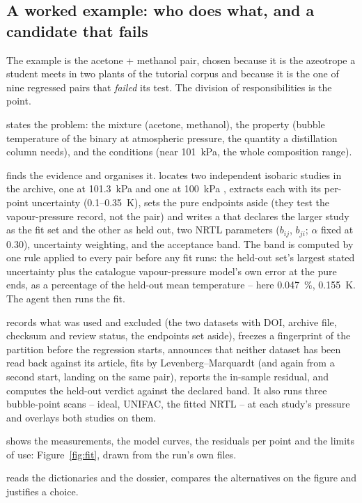 \documentclass[11pt,a4paper]{article}
\newcommand{\code}[1]{\texttt{\detokenize{#1}}}
\begin{document}
\subsection{A worked example: who does what, and a candidate that fails}
\label{sec:worked}

The example is the acetone + methanol pair, chosen because it is the
azeotrope a student meets in two plants of the tutorial corpus and because
it is the one of nine regressed pairs that \emph{failed} its test.  The
division of responsibilities is the point.

\begin{description}[leftmargin=1.6em, itemsep=3pt]
\item[The user] states the problem: the mixture (acetone, methanol), the
  property (bubble temperature of the binary at atmospheric pressure, the
  quantity a distillation column needs), and the conditions (near
  101~kPa, the whole composition range).
\item[The agent] finds the evidence and organises it.  \code{choupo-thermoml}
  locates two independent isobaric studies in the archive, one at
  101.3~kPa \citep{chen2015} and one at 100~kPa \citep{orchilles2007},
  extracts each with its per-point uncertainty (0.1--0.35~K), sets the pure
  endpoints aside (they test the vapour-pressure record, not the pair) and
  writes a \code{propsDict} that declares the larger study as the fit set
  and the other as held out, two NRTL parameters ($b_{ij}$, $b_{ji}$;
  $\alpha$ fixed at 0.30), uncertainty weighting, and the acceptance band.
  The band is computed by one rule applied to every pair before any fit
  runs: the held-out set's largest stated uncertainty plus the catalogue
  vapour-pressure model's own error at the pure ends, as a percentage of
  the held-out mean temperature -- here 0.047~\%, 0.155~K.  The agent then
  runs the fit.
\item[The engine] records what was used and excluded (the two datasets with
  DOI, archive file, checksum and review status, the endpoints set aside),
  freezes a fingerprint of the partition before the regression starts,
  announces that neither dataset has been read back against its article,
  fits by Levenberg--Marquardt (and again from a second start, landing on
  the same pair), reports the in-sample residual, and computes the held-out
  verdict against the declared band.  It also runs three bubble-point
  scans -- ideal, UNIFAC, the fitted NRTL -- at each study's pressure and
  overlays both studies on them.
\item[The interface] shows the measurements, the model curves, the
  residuals per point and the limits of use: Figure~\ref{fig:fit}, drawn
  from the run's own files.
\item[The student] reads the dictionaries and the dossier, compares the
  alternatives on the figure and justifies a choice.
\end{description}
\end{document}
